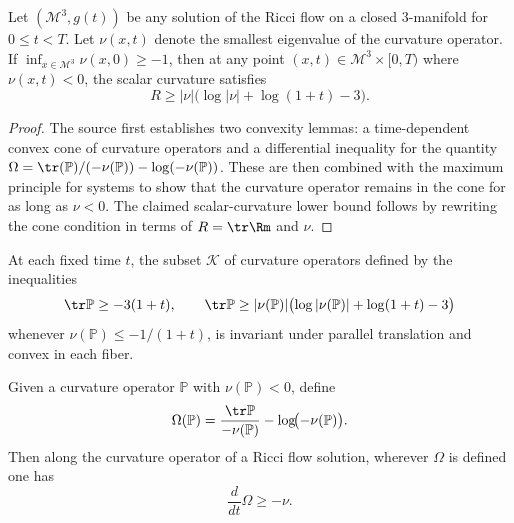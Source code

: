 \begin{theorem}
\label{ch09-thm-pinching-estimate}

Let \((\mathcal M^3,g(t))\) be any solution of the Ricci flow on a closed \(3\)-manifold for \(0\le t<T\). Let \(\nu(x,t)\) denote the smallest eigenvalue of the curvature operator. If \(\inf_{x\in\mathcal M^3}\nu(x,0)\ge -1\), then at any point \((x,t)\in\mathcal M^3\times[0,T)\) where \(\nu(x,t)<0\), the scalar curvature satisfies
\[
R\ge |\nu|\bigl(\log |\nu|+\log(1+t)-3\bigr).
\]
\end{theorem}

\begin{proof}
\sketch The source first establishes two convexity lemmas: a time-dependent convex cone of curvature operators and a differential inequality for the quantity \(\Omega=\tr(\mathbb P)/(-\nu(\mathbb P))-\log(-\nu(\mathbb P))\). These are then combined with the maximum principle for systems to show that the curvature operator remains in the cone for as long as \(\nu<0\). The claimed scalar-curvature lower bound follows by rewriting the cone condition in terms of \(R=\tr \Rm\) and \(\nu\).
\end{proof}

\begin{lemma}
\label{ch09-lem-pinching-cone-convexity}

At each fixed time \(t\), the subset \(\mathcal K\) of curvature operators defined by the inequalities
\[
\tr\mathbb P\ge -3(1+t),\qquad
\tr\mathbb P\ge |\nu(\mathbb P)|\bigl(\log|\nu(\mathbb P)|+\log(1+t)-3\bigr)
\]
whenever \(\nu(\mathbb P)\le -1/(1+t)\), is invariant under parallel translation and convex in each fiber.
\end{lemma}

\begin{lemma}
\label{ch09-lem-omega-derivative}

Given a curvature operator \(\mathbb P\) with \(\nu(\mathbb P)<0\), define
\[
\Omega(\mathbb P)=\frac{\tr\mathbb P}{-\nu(\mathbb P)}-\log\!\bigl(-\nu(\mathbb P)\bigr).
\]
Then along the curvature operator of a Ricci flow solution, wherever \(\Omega\) is defined one has
\[
\frac{d}{dt}\Omega\ge -\nu.
\]
\end{lemma}

